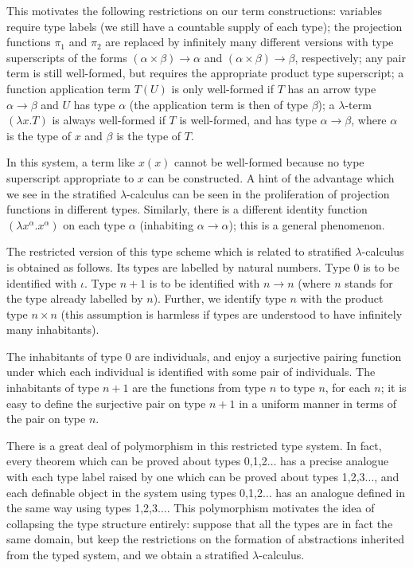 \documentclass{kluwer}
\begin{document}
\begin{article}
This motivates the following restrictions on our term constructions:
variables require type labels (we still have a countable supply of
each type); the projection functions $\pi_1$ and $\pi_2$ are replaced
by infinitely many different versions with type superscripts of the
forms $(\alpha\times\beta)\rightarrow \alpha$ and
$(\alpha\times\beta)\rightarrow \beta$, respectively; any pair term is
still well-formed, but requires the appropriate product type
superscript; a function application term $T(U)$ is only well-formed if
$T$ has an arrow type $\alpha \rightarrow \beta$ and $U$ has type
$\alpha$ (the application term is then of type $\beta$); a
$\lambda$-term $(\lambda x.T)$ is always well-formed if $T$ is
well-formed, and has type $\alpha\rightarrow \beta$, where $\alpha$ is
the type of $x$ and $\beta$ is the type of $T$.

In this system, a term like $x(x)$ cannot be well-formed because no
type superscript appropriate to $x$ can be constructed.  A hint of the
advantage which we see in the stratified $\lambda$-calculus can be
seen in the proliferation of projection functions in different types.
Similarly, there is a different identity function $(\lambda
x^{\alpha}.x^{\alpha})$ on each type $\alpha$ (inhabiting $\alpha
\rightarrow \alpha$); this is a general phenomenon.

The restricted version of this type scheme which is related to
stratified $\lambda$-calculus is obtained as follows.  Its types are
labelled by natural numbers.  Type 0 is to be identified with
$\iota$.  Type $n+1$ is to be identified with $n \rightarrow n$
(where $n$ stands for the type already labelled by $n$).  Further, we
identify type $n$ with the product type $n \times n$ (this assumption
is harmless if types are understood to have infinitely many
inhabitants).

The inhabitants of type 0 are individuals, and enjoy a surjective
pairing function under which each individual is identified with some
pair of individuals.  The inhabitants of type $n+1$ are the functions
from type $n$ to type $n$, for each $n$; it is easy to define the
surjective pair on type $n+1$ in a uniform manner in terms of the pair
on type $n$.

There is a great deal of polymorphism in this restricted type system.
In fact, every theorem which can be proved about types 0,1,2$\ldots$
has a precise analogue with each type label raised by one which can be
proved about types 1,2,3$\ldots$, and each definable object in the
system using types 0,1,2$\ldots$ has an analogue defined in the same
way using types 1,2,3$\ldots$.  This polymorphism motivates the idea
of collapsing the type structure entirely: suppose that all the types
are in fact the same domain, but keep the restrictions on the
formation of abstractions inherited from the typed system, and we
obtain a stratified $\lambda$-calculus.


\end{article}
\end{document}
